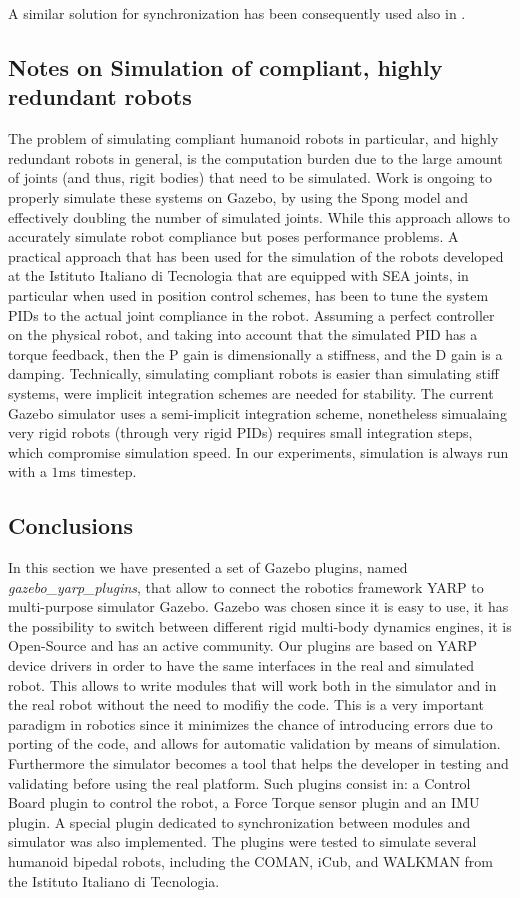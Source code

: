 A similar solution for synchronization has been consequently used also in \cite{wbi14}.

\subsection{Notes on Simulation of compliant, highly redundant robots}
The problem of simulating compliant humanoid robots in particular, and highly redundant robots in general, is the computation burden due to the large amount of joints (and thus, rigit bodies) that need to be simulated.
Work is ongoing to properly simulate these systems on Gazebo, by using the Spong model and effectively doubling the number of simulated joints. While this approach allows to accurately simulate robot compliance but poses performance problems.
A practical approach that has been used for the simulation of the robots developed at the Istituto Italiano di Tecnologia that are equipped with SEA joints, in particular when used in position control schemes, has been to tune the system PIDs to the actual joint compliance in the robot. Assuming a perfect controller on the physical robot, and taking into account that the simulated PID has a torque feedback, then the P gain is dimensionally a stiffness, and the D gain is a damping.
Technically, simulating compliant robots is easier than simulating stiff systems, were implicit integration schemes are needed for stability. 
The current Gazebo simulator uses a semi-implicit integration scheme, nonetheless simualaing very rigid robots (through very rigid PIDs) requires small integration steps, which compromise simulation speed. In our experiments, simulation is always run with a $1$ms timestep.

\subsection{Conclusions}
In this section we have presented a set of Gazebo plugins, named \emph{gazebo\_yarp\_plugins}, that allow to connect the robotics framework YARP to multi-purpose simulator Gazebo. Gazebo was chosen since it is easy to use, it has the possibility to switch between different rigid multi-body dynamics engines, it is Open-Source and has an active community. Our plugins are based on YARP device drivers in order to have the same interfaces in the real and simulated robot. This allows to write modules that will work both in the simulator and in the real robot without the need to modifiy the code. This is a very important paradigm in robotics since it minimizes the chance of introducing errors due to porting of the code, and allows for automatic validation by means of simulation. Furthermore the simulator becomes a tool that helps the developer in testing and validating before using the real platform.
Such plugins consist in: a Control Board plugin to control the robot, a Force Torque sensor plugin and an IMU plugin. A special plugin dedicated to synchronization between modules and simulator was also implemented. The plugins were tested to simulate several humanoid bipedal robots, including the COMAN, iCub, and WALKMAN from the Istituto Italiano di Tecnologia.



